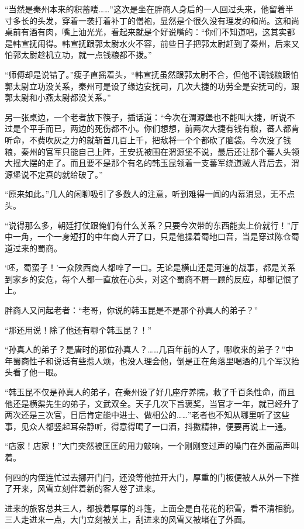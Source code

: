 “当然是秦州本来的积蓄喽……”这次是坐在胖商人身后的一人回过头来，他留着半寸多长的头发，穿着一袭打着补丁的僧袍，显然是个很久没有理发的和尚。这和尚桌前有酒有肉，嘴上油光光，看起来就是个好说嘴的：“你们不知道吧，这其实都是韩宣抚闹得。韩宣抚跟郭太尉水火不容，前些日子把郭太尉赶到了秦州，后来又怕郭太尉趁机立功，就一点钱粮都不拨。”

“师傅却是说错了。”瘦子直摇着头，“韩宣抚虽然跟郭太尉不合，但他不调钱粮跟怕郭太尉立功没关系，秦州可是设了缘边安抚司，几次大捷的功劳全是安抚司的，跟郭太尉和小燕太尉都没关系。”

另一张桌边，一个老者放下筷子，插话道：“今次在渭源堡也不能叫大捷，听说不过是个平手而已，两边的死伤都不小。你们想想，前两次大捷有钱有粮，蕃人都肯听命，不费吹灰之力的就斩首几百上千，把敌将一个个都砍了脑袋。今次没了钱粮，秦州的官军只能自己上阵，王安抚被围在渭源堡不说，最后还让那个蕃人头领大摇大摆的走了。而且要不是那个有名的韩玉昆领着一支蕃军绕道贼人背后去，渭源堡说不定真的就给破了。”

“原来如此。”几人的闲聊吸引了多数人的注意，听到难得一闻的内幕消息，无不点头。

“说得那么多，朝廷打仗跟俺们有什么关系？只要今次带的东西能卖上价就行！”厅中一角，一个一身短打的中年商人开了口，只是他操着蜀地口音，当是穿过陈仓蜀道过来的蜀商。

‘呸，蜀蛮子！’一众陕西商人都啐了一口。无论是横山还是河湟的战事，都是关系到家乡的安危，每个人都一直放在心头，对这个蜀商不屑一顾的反应，却都记恨了上。

胖商人又问起老者：“老哥，你说的韩玉昆是不是那个孙真人的弟子？”

“那还用说！除了他还有哪个韩玉昆？！”

“孙真人的弟子？是唐时的那位孙真人？……几百年前的人了，哪收来的弟子？”中年蜀商性子和说话有些惹人烦，也没人理会他，倒是正在角落里喝酒的几个军汉抬头看了他一眼。

“韩玉昆不仅是孙真人的弟子，在秦州设了好几座疗养院，救了千百条性命，而且他还是横渠先生的弟子，文武双全。天子几次下旨褒奖，当官才一年，就已经升了两次还是三次官，日后肯定能中进士、做相公的……”老者也不知从哪里听了这些事，见众人都竖起耳朵静听，得意得喝了一口酒，抖擞精神，便要再说上一通。

“店家！店家！”大门突然被匡匡的用力敲响，一个刚刚变过声的嗓门在外面高声叫着。

何四的内侄连忙过去挪开门闩，还没等他拉开大门，厚重的门板便被人从外一下推了开来，风雪立刻伴着新的客人卷了进来。

进来的旅客总共三人，都披着厚厚的斗篷，上面全是白花花的积雪，看不清相貌。三人走进来一点，大门立刻被关上，刮进来的风雪又被堵在了外面。

